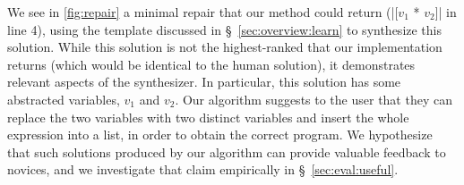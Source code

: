  We see in \autoref{fig:repair} a minimal repair that our
method could return (|[$v_1$ * $v_2$]| in line 4), using the template discussed
in \S~\ref{sec:overview:learn} to synthesize this solution. While this solution
is not the highest-ranked that our implementation returns (which would be
identical to the human solution), it demonstrates relevant aspects of the
synthesizer. In particular, this solution has some abstracted variables, $v_1$
and $v_2$. Our algorithm suggests to the user that they can replace the two
variables with two distinct variables and insert the whole expression into a
list, in order to obtain the correct program. We hypothesize that such solutions
produced by our algorithm can provide valuable feedback to novices, and we
investigate that claim empirically in \S~\ref{sec:eval:useful}.
